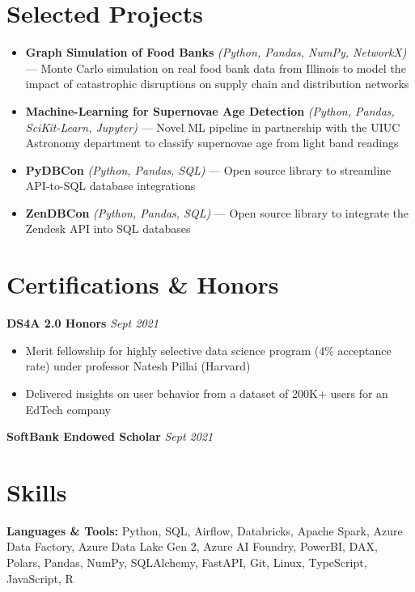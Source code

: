 \documentclass[11pt, a4paper]{article}
\begin{document}
\section{Selected Projects}

\begin{itemize}
    \item \textbf{Graph Simulation of Food Banks} \textit{(Python, Pandas, NumPy, NetworkX)} ---
        Monte Carlo simulation on real food bank data from Illinois to model the impact of catastrophic disruptions on supply chain and distribution networks
    \item \textbf{Machine-Learning for Supernovae Age Detection} \textit{(Python, Pandas, SciKit-Learn, Jupyter)} ---
        Novel ML pipeline in partnership with the UIUC Astronomy department to classify supernovae age from light band readings
    \item \textbf{PyDBCon} \textit{(Python, Pandas, SQL)} --- Open source library to streamline API-to-SQL database integrations
    \item \textbf{ZenDBCon} \textit{(Python, Pandas, SQL)} --- Open source library to integrate the Zendesk API into SQL databases
\end{itemize}

\section{Certifications \& Honors}

\textbf{DS4A 2.0 Honors} \hfill \textit{Sept 2021}
\begin{itemize}
    \item Merit fellowship for highly selective data science program (4\% acceptance rate) under professor Natesh Pillai (Harvard)
    \item Delivered insights on user behavior from a dataset of 200K+ users for an EdTech company
\end{itemize}

\vspace{4pt}
\textbf{SoftBank Endowed Scholar} \hfill \textit{Sept 2021}

\section{Skills}

\textbf{Languages \& Tools:} Python, SQL, Airflow, Databricks, Apache Spark, Azure Data Factory, Azure Data Lake Gen 2, Azure AI Foundry, PowerBI, DAX, Polars, Pandas, NumPy, SQLAlchemy, FastAPI, Git, Linux, TypeScript, JavaScript, R
\end{document}
